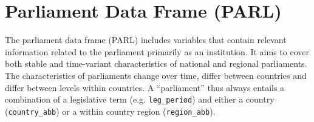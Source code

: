 \documentclass{article}
\begin{document}
\newpage

\section{Parliament Data Frame (\gls{PARL})}\label{PARL}

    The parliament data frame (\gls{PARL}) includes variables that contain relevant information related to the parliament primarily as an institution. It aims to cover both stable and time-variant characteristics of national and regional parliaments. The characteristics of parliaments change over time, differ between countries and differ between levels within countries. 
    \parapgraph A ``parliament'' thus always entails a combination of a legislative term (e.g. \texttt{leg\_period}) and either a country (\texttt{country\_abb}) or a within country region (\texttt{region\_abb}).
    
    
    
\end{document}
